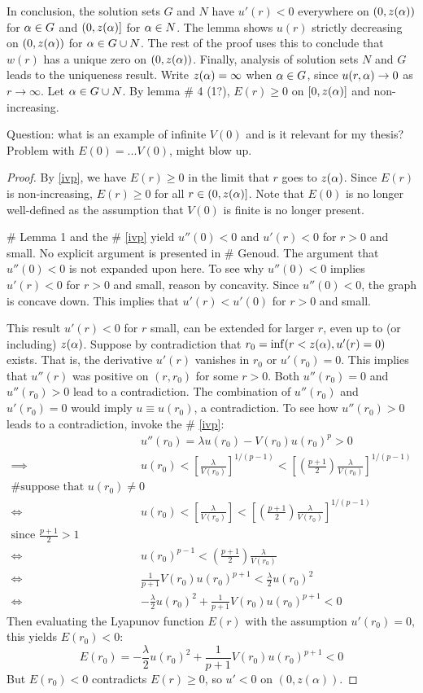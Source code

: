 In conclusion, the solution sets $G$ and $N$ have $u'(r)<0$ everywhere on $(0,z(\alpha))$ for $\alpha\in G$ and $(0,z(\alpha)]$ for $\alpha\in N$. The lemma shows $u(r)$ strictly decreasing on $(0,z(\alpha))$ for $\alpha\in G\cup N$. The rest of the proof uses this to conclude that $w(r)$ has a unique zero on $(0,z(\alpha))$. Finally, analysis of solution sets $N$ and $G$ leads to the uniqueness result. Write $z(\alpha)=\infty$ when $\alpha\in G$, since $u(r,\alpha)\to0$ as $r\to\infty$. Let $\alpha\in G\cup N$. By lemma \# 4 (1?), $E(r)\geq0$ on $[0,z(\alpha)]$ and non-increasing.

Question: what is an example of infinite $V(0)$ and is it relevant for my thesis? Problem with $E(0)=...V(0)$, might blow up.

\begin{proof}
By \cref{ivp}, we have $E(r)\geq0$ in the limit that $r$ goes to $z(\alpha)$. Since $E(r)$ is non-increasing, $E(r)\geq0$ for all $r\in(0,z(\alpha)]$. Note that $E(0)$ is no longer well-defined as the assumption that $V(0)$ is finite is no longer present.

\# Lemma 1 and the \# \cref{ivp} yield $u''(0)<0$ and $u'(r)<0$ for $r>0$ and small. No explicit argument is presented in \# Genoud. The argument that $u''(0)<0$ is not expanded upon here. To see why $u''(0)<0$ implies $u'(r)<0$ for $r>0$ and small, reason by concavity. Since $u''(0)<0$, the graph is concave down. This implies that $u'(r)<u'(0)$ for $r>0$ and small. 

This result $u'(r)<0$ for $r$ small, can be extended for larger $r$, even up to (or including) $z(\alpha)$. Suppose by contradiction that $r_0=\inf(r<z(\alpha),u'(r)=0)$ exists. That is, the derivative $u'(r)$ vanishes in $r_0$ or $u'(r_0)=0$. This implies that $u''(r)$ was positive on $(r,r_0)$ for some $r>0$. Both $u''(r_0)=0$ and $u''(r_0)>0$ lead to a contradiction. The combination of $u''(r_0)$ and $u'(r_0)=0$ would imply $u\equiv u(r_0)$, a contradiction. To see how $u''(r_0)>0$ leads to a contradiction, invoke the \# \cref{ivp}: 
\begin{align*}
&u''(r_0)=\lambda u(r_0)-V(r_0)u(r_0)^p>0\\
\implies &u(r_0)<\left[\frac{\lambda}{V(r_0)}\right]^{1/(p-1)}<\left[\left(\frac{p+1}{2}\right)\frac{\lambda}{V(r_0)}\right]^{1/(p-1)}\\
\text{\# suppose that }u(r_0)\neq0\\
\iff &u(r_0)<\left[\frac{\lambda}{V(r_0)}\right]<\left[\left(\frac{p+1}{2}\right)\frac{\lambda}{V(r_0)}\right]^{1/(p-1)}\\
\text{since }\frac{p+1}{2}>1\\
\iff &u(r_0)^{p-1}<\left(\frac{p+1}{2}\right)\frac{\lambda}{V(r_0)}\\
\iff &\frac{1}{p+1}V(r_0)u(r_0)^{p+1}<\frac{\lambda}{2}u(r_0)^2\\
\iff &-\frac{\lambda}{2}u(r_0)^2+\frac{1}{p+1}V(r_0)u(r_0)^{p+1}<0
\end{align*}
Then evaluating the Lyapunov function $E(r)$ with the assumption $u'(r_0)=0$, this yields $E(r_0)<0$:
$$ E(r_0)=-\frac{\lambda}{2}u(r_0)^2+\frac{1}{p+1}V(r_0)u(r_0)^{p+1}<0 $$
But $E(r_0)<0$ contradicts $E(r)\geq0$, so $u'<0$ on $(0,z(\alpha))$.


\end{proof}
